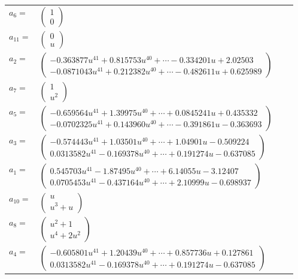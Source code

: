 \documentclass[1p]{elsarticle_modified}
\theoremstyle{definition}
\begin{document}
\begin{tabular}{m{7pt} m{180pt} m{7pt} m{180pt} }
\flushright $a_{6}=$&$\begin{pmatrix}1\\0\end{pmatrix}$ \\
\flushright $a_{11}=$&$\begin{pmatrix}0\\u\end{pmatrix}$ \\
\flushright $a_{2}=$&$\begin{pmatrix}-0.363877 u^{41}+0.815753 u^{40}+\cdots-0.334201 u+2.02503\\-0.0871043 u^{41}+0.212382 u^{40}+\cdots-0.482611 u+0.625989\end{pmatrix}$ \\
\flushright $a_{7}=$&$\begin{pmatrix}1\\u^2\end{pmatrix}$ \\
\flushright $a_{5}=$&$\begin{pmatrix}-0.659564 u^{41}+1.39975 u^{40}+\cdots+0.0845241 u+0.435332\\-0.0702325 u^{41}+0.143960 u^{40}+\cdots-0.391861 u-0.363693\end{pmatrix}$ \\
\flushright $a_{3}=$&$\begin{pmatrix}-0.574443 u^{41}+1.03501 u^{40}+\cdots+1.04901 u-0.509224\\0.0313582 u^{41}-0.169378 u^{40}+\cdots+0.191274 u-0.637085\end{pmatrix}$ \\
\flushright $a_{1}=$&$\begin{pmatrix}0.545703 u^{41}-1.87495 u^{40}+\cdots+6.14055 u-3.12407\\0.0705453 u^{41}-0.437164 u^{40}+\cdots+2.10999 u-0.698937\end{pmatrix}$ \\
\flushright $a_{10}=$&$\begin{pmatrix}u\\u^3+u\end{pmatrix}$ \\
\flushright $a_{8}=$&$\begin{pmatrix}u^2+1\\u^4+2 u^2\end{pmatrix}$ \\
\flushright $a_{4}=$&$\begin{pmatrix}-0.605801 u^{41}+1.20439 u^{40}+\cdots+0.857736 u+0.127861\\0.0313582 u^{41}-0.169378 u^{40}+\cdots+0.191274 u-0.637085\end{pmatrix}$ \\

\end{tabular}
\end{document}
